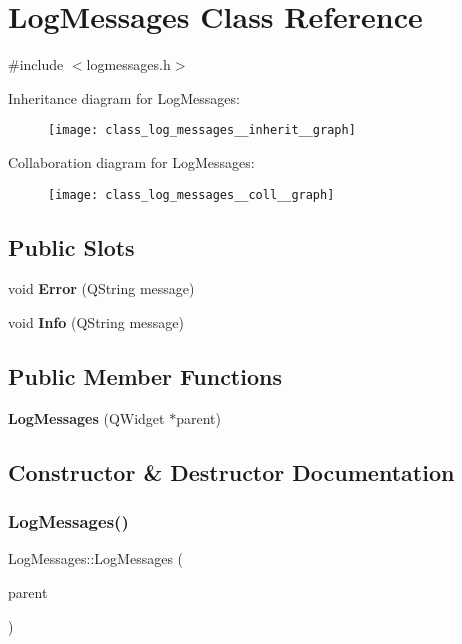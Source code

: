 \section{Log\+Messages Class Reference}
\label{class_log_messages}


{\ttfamily \#include $<$logmessages.\+h$>$}



Inheritance diagram for Log\+Messages\+:\nopagebreak
\begin{figure}[H]
\begin{center}
\leavevmode
\texttt{[image: class\_log\_messages\_\_inherit\_\_graph]}
\end{center}
\end{figure}


Collaboration diagram for Log\+Messages\+:\nopagebreak
\begin{figure}[H]
\begin{center}
\leavevmode
\texttt{[image: class\_log\_messages\_\_coll\_\_graph]}
\end{center}
\end{figure}
\subsection*{Public Slots}
\begin{DoxyCompactItemize}
\item 
void \textbf{ Error} (Q\+String message)
\item 
void \textbf{ Info} (Q\+String message)
\end{DoxyCompactItemize}
\subsection*{Public Member Functions}
\begin{DoxyCompactItemize}
\item 
\textbf{ Log\+Messages} (Q\+Widget $\ast$parent)
\end{DoxyCompactItemize}


\subsection{Constructor \& Destructor Documentation}
\mbox{\label{class_log_messages_a01ec3abee5060454d54b3fdf6fff44ad}} 
\subsubsection{Log\+Messages()}
{\footnotesize\ttfamily Log\+Messages\+::\+Log\+Messages (\begin{DoxyParamCaption}\item[{Q\+Widget $\ast$}]{parent }\end{DoxyParamCaption})}



